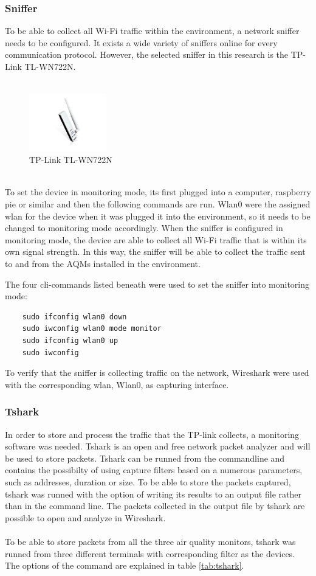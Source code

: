 \subsubsection{Sniffer}
To be able to collect all Wi-Fi traffic within the environment, a network sniffer needs to be configured. It exists a wide variety of sniffers online for every communication protocol. However, the selected sniffer in this research is the TP-Link TL-WN722N. 
\\\\
\begin{figure} [!ht]
    \centering
    \includegraphics[width=0.3\textwidth]{figures/Sniffer.jpg}
    \caption{TP-Link TL-WN722N \cite{Sniffer}}
    \label{fig:Sniffer}
\end{figure}
\\
To set the device in monitoring mode, its first plugged into a computer, raspberry pie or similar and then the following commands are run. Wlan0 were the assigned wlan for the device when it was plugged it into the environment, so it needs to be changed to monitoring mode accordingly. When the sniffer is configured in monitoring mode, the device are able to collect all Wi-Fi traffic that is within its own signal strength. In this way, the sniffer will be able to collect the traffic sent to and from the AQMs installed in the environment. 

The four cli-commands listed beneath were used to set the sniffer into monitoring mode:
\begin{verbatim}
    sudo ifconfig wlan0 down
    sudo iwconfig wlan0 mode monitor
    sudo ifconfig wlan0 up
    sudo iwconfig
\end{verbatim}
To verify that the sniffer is collecting traffic on the network, Wireshark were used with the corresponding wlan, Wlan0, as capturing interface. 

\subsubsection{Tshark}
In order to store and process the traffic that the TP-link collects, a monitoring software was needed. Tshark is an open and free network packet analyzer and will be used to store packets. Tshark can be runned from the commandline and contains the possibilty of using capture filters based on a numerous parameters, such as addresses, duration or size. To be able to store the packets captured, tshark was runned with the option of writing its results to an output file rather than in the command line. The packets collected in the output file by tshark are possible to open and analyze in Wireshark. 
\\\\
To be able to store packets from all the three air quality monitors, tshark was runned from three different terminals with corresponding filter as the devices. The options of the command are explained in table \ref{tab:tshark}.

